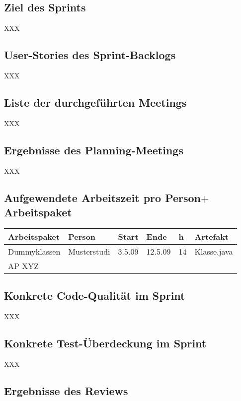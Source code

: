 
\subsection{Ziel des Sprints}

XXX

\subsection{User-Stories des Sprint-Backlogs}

XXX

\subsection{Liste der durchgeführten Meetings}

XXX

\subsection{Ergebnisse des Planning-Meetings}

XXX

\subsection{Aufgewendete Arbeitszeit pro Person$+$Arbeitspaket}

\begin{longtable}{|p{4cm}|l|l|l|l|l|}
        \hline
        Arbeitspaket & Person & Start & Ende & h & Artefakt\\
        \hline
        Dummyklassen & Musterstudi & 3.5.09 & 12.5.09 & 14 & Klasse.java\\ \hline
        AP XYZ &  &  &  & & \\ \hline
      \end{longtable}

\subsection{Konkrete Code-Qualität im Sprint}

XXX

\subsection{Konkrete Test-Überdeckung im Sprint}

XXX

\subsection{Ergebnisse des Reviews}

